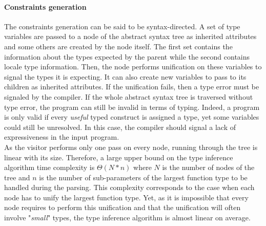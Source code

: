 \documentclass[a4paper,11pt]{article}
\begin{document}
\paragraph{Constraints generation} The constraints generation can be said to be syntax-directed. A set of type variables are passed to a node of the abstract syntax tree as inherited attributes and some others are created by the node itself. The first set contains the information about the types expected by the parent while the second contains locale type information. Then, the node performs unification on these variables to signal the types it is expecting. It can also create new variables to pass to its children as inherited attributes. If the unification fails, then a type error must be signaled by the compiler. If the whole abstract syntax tree is traversed without type error, the program can still be invalid in terms of typing. Indeed, a program is only valid if every \textit{useful} typed construct is assigned a type, yet some variables could still be unresolved. In this case, the compiler should signal a lack of expressiveness in the input program. \\
As the visitor performs only one pass on every node, running through the tree is linear with its size. Therefore, a large upper bound on the type inference algorithm time complexity is $\Theta(N * n)$ where $N$ is the number of nodes of the tree and $n$ is the number of sub-parameters of the largest function type to be handled during the parsing. This complexity corresponds to the case when each node has to unify the largest function type. Yet, as it is impossible that every node requires to perform this unification and that the unification will often involve "\textit{small}" types, the type inference algorithm is almost linear on average.
\end{document}
